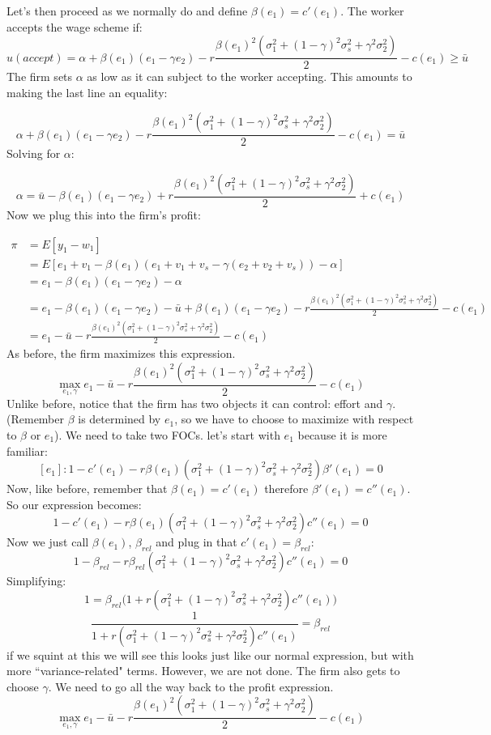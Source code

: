 \documentclass{article}
\begin{document}
Let's then proceed as we normally do and define $\beta(e_1)=c'(e_1)$. The worker accepts the wage scheme if:
\[u(accept) = \alpha +\beta(e_1) (e_1-\gamma e_2) -r \frac{\beta(e_1)^2 ( \sigma_1^2+ (1-\gamma)^2\sigma_s^2 +\gamma^2 \sigma_2^2 )}{2} -c(e_1 ) \geq \bar u\]
The firm sets $\alpha$ as low as it can subject to the worker accepting. This amounts to making the last line an equality:

\[ \alpha +\beta(e_1) (e_1-\gamma e_2) -r \frac{\beta(e_1)^2 ( \sigma_1^2+ (1-\gamma)^2\sigma_s^2 +\gamma^2 \sigma_2^2 )}{2} -c(e_1 ) =\bar u\]
Solving for $\alpha$:

\[ \alpha =\bar u-\beta(e_1) (e_1-\gamma e_2) +r \frac{\beta(e_1)^2 ( \sigma_1^2+ (1-\gamma)^2\sigma_s^2 +\gamma^2 \sigma_2^2 )}{2} +c(e_1 )\]
Now we plug this into the firm's profit:

\begin{align*}
    \pi&= E[y_1-w_1]\\
    &= E[e_1+v_1- \beta(e_1) (e_1+v_1+v_s-\gamma (e_2+v_2+v_s )) -\alpha ]\\
    &= e_1 - \beta(e_1) (e_1-\gamma e_2)  -\alpha \\
    &= e_1 -\beta(e_1) (e_1-\gamma e_2)-\bar u+\beta(e_1) (e_1-\gamma e_2) -r \frac{\beta(e_1)^2 ( \sigma_1^2+ (1-\gamma)^2\sigma_s^2 +\gamma^2 \sigma_2^2 )}{2} -c(e_1 )\\
    &= e_1 -\bar u -r \frac{\beta(e_1)^2 ( \sigma_1^2+ (1-\gamma)^2\sigma_s^2 +\gamma^2 \sigma_2^2 )}{2} -c(e_1 )
\end{align*}
As before, the firm maximizes this expression. 
\[\max_{e_1, \gamma} e_1 -\bar u -r \frac{\beta(e_1)^2 ( \sigma_1^2+ (1-\gamma)^2\sigma_s^2 +\gamma^2 \sigma_2^2 )}{2} -c(e_1 )\]
Unlike before, notice that the firm has two objects it can control: effort and $\gamma$. (Remember $\beta$ is determined by $e_1$, so we have to choose to maximize with respect to $\beta $ or $e_1$). We need to take two FOCs. let's start with $e_1$ because it is more familiar:
\[[e_1]: 1 - c'(e_1) -r \beta(e_1) ( \sigma_1^2+ (1-\gamma)^2\sigma_s^2 +\gamma^2 \sigma_2^2 )\beta'(e_1)=0\]
Now, like before, remember that $\beta(e_1)=c'(e_1)$ therefore $\beta'(e_1)=c''(e_1)$. So our expression becomes:
\[ 1 - c'(e_1) -r \beta(e_1) ( \sigma_1^2+ (1-\gamma)^2\sigma_s^2 +\gamma^2 \sigma_2^2 )c''(e_1)=0\]
Now we just call $\beta(e_1)$, $\beta_{rel}$ and plug in that $c'(e_1)=\beta_{rel}$:
\[ 1 - \beta_{rel} -r \beta_{rel} ( \sigma_1^2+ (1-\gamma)^2\sigma_s^2 +\gamma^2 \sigma_2^2 )c''(e_1)=0\]
Simplifying:
\[ 1 = \beta_{rel}\bigg (1+r  ( \sigma_1^2+ (1-\gamma)^2\sigma_s^2 +\gamma^2 \sigma_2^2 )c''(e_1) \bigg )\]
\[ \frac{1}{1+r  ( \sigma_1^2+ (1-\gamma)^2\sigma_s^2 +\gamma^2 \sigma_2^2 )c''(e_1)} = \beta_{rel}\]
if we squint at this we will see this looks just like our normal expression, but with more ``variance-related" terms. However, we are not done. The firm also gets to choose $\gamma$. We need to go all the way back to the profit expression.
\[\max_{e_1, \gamma} e_1 -\bar u -r \frac{\beta(e_1)^2 ( \sigma_1^2+ (1-\gamma)^2\sigma_s^2 +\gamma^2 \sigma_2^2 )}{2} -c(e_1 )\]
\end{document}
